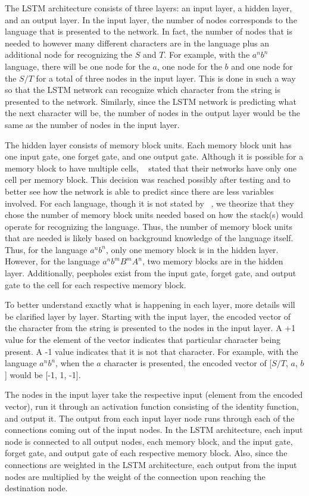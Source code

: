 \documentclass[11pt,letterpaper]{article}
\begin{document}
The LSTM architecture consists of three layers: an input layer, a hidden layer, and an output layer. In the input layer, the number of nodes corresponds to the language that is presented to the network. In fact, the number of nodes that is needed to however many different characters are in the language plus an additional node for recognizing the $S$ and $T$. For example, with the $a^nb^n$ language, there will be one node for the $a$, one node for the $b$ and one node for the $S/T$ for a total of three nodes in the input layer. This is done in such a way so that the LSTM network can recognize which character from the string is presented to the network. Similarly, since the LSTM network is predicting what the next character will be, the number of nodes in the output layer would be the same as the number of nodes in the input layer.

The hidden layer consists of memory block units. Each memory block unit has one input gate, one forget gate, and one output gate. Although it is possible for a memory block to have multiple cells, ~\cite{Gers:01} stated that their networks have only one cell per memory block. This decision was reached possibly after testing and to better see how the network is able to predict since there are less variables involved. For each language, though it is not stated by ~\cite{Gers:01}, we theorize that they chose the number of memory block units needed based on how the stack(s) would operate for recognizing the language. Thus, the number of memory block units that are needed is likely based on background knowledge of the language itself. Thus, for the language $a^nb^n$, only one memory block is in the hidden layer. However, for the language $a^nb^mB^mA^n$, two memory blocks are in the hidden layer. Additionally, peepholes exist from the input gate, forget gate, and output gate to the cell for each respective memory block.

To better understand exactly what is happening in each layer, more details will be clarified layer by layer. Starting with the input layer, the encoded vector of the character from the string is presented to the nodes in the input layer. A +1 value for the element of the vector indicates that particular character being present. A -1 value indicates that it is not that character. For example, with the language $a^nb^n$, when the $a$ character is presented, the encoded vector of [$S/T$, $a$, $b$] would be [-1, 1, -1].

The nodes in the input layer take the respective input (element from the encoded vector), run it through an activation function consisting of the identity function, and output it. The output from each input layer node runs through each of the connections coming out of the input nodes. In the LSTM architecture, each input node is connected to all output nodes, each memory block, and the input gate, forget gate, and output gate of each respective memory block. Also, since the connections are weighted in the LSTM architecture, each output from the input nodes are multiplied by the weight of the connection upon reaching the destination node.
\end{document}
